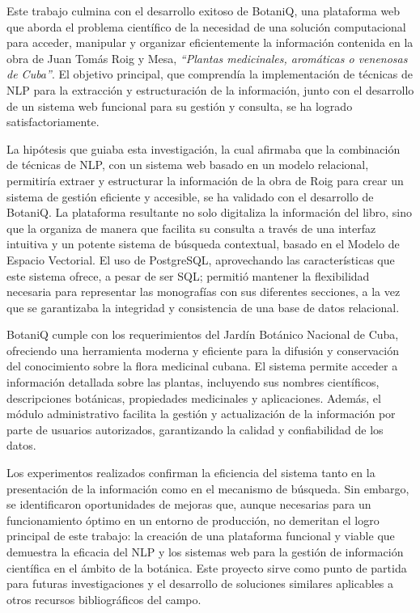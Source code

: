 \begin{conclusions}
    Este trabajo culmina con el desarrollo exitoso de BotaniQ, una plataforma web 
    que aborda el problema científico de la necesidad de una solución computacional 
    para acceder, manipular y organizar eficientemente la información contenida 
    en la obra de Juan Tomás Roig y Mesa, 
    \textit{``Plantas medicinales, aromáticas o venenosas de Cuba''}. 
    El objetivo principal, que comprendía la implementación de técnicas de NLP para 
    la extracción y estructuración de la información, junto con el desarrollo de 
    un sistema web funcional para su gestión y consulta, se ha logrado satisfactoriamente.

    La hipótesis que guiaba esta investigación, la cual afirmaba que la combinación 
    de técnicas de NLP, con un sistema web basado en un modelo relacional, permitiría 
    extraer y estructurar la información de la obra de Roig para crear un sistema 
    de gestión eficiente y accesible, se ha validado con el desarrollo de BotaniQ. 
    La plataforma resultante no solo digitaliza la información del libro, sino que 
    la organiza de manera que facilita su consulta a través de una interfaz intuitiva 
    y un potente sistema de búsqueda contextual, basado en el Modelo de Espacio Vectorial. 
    El uso de PostgreSQL, aprovechando las características que este sistema ofrece, 
    a pesar de ser SQL; permitió mantener la flexibilidad necesaria para representar las monografías 
    con sus diferentes secciones, a la vez que se garantizaba la integridad y 
    consistencia de una base de datos relacional.

    BotaniQ cumple con los requerimientos del Jardín Botánico Nacional de Cuba, 
    ofreciendo una herramienta moderna y eficiente para la difusión y conservación del 
    conocimiento sobre la flora medicinal cubana. El sistema permite acceder a información 
    detallada sobre las plantas, incluyendo sus nombres científicos, descripciones botánicas, 
    propiedades medicinales y aplicaciones. Además, el módulo administrativo facilita 
    la gestión y actualización de la información por parte de usuarios autorizados, 
    garantizando la calidad y confiabilidad de los datos.

    Los experimentos realizados confirman la eficiencia del sistema tanto en la 
    presentación de la información como en el mecanismo de búsqueda. Sin embargo, 
    se identificaron oportunidades de mejoras que, aunque necesarias para un 
    funcionamiento óptimo en un entorno de producción, no demeritan el logro principal 
    de este trabajo: la creación de una plataforma funcional y viable que demuestra 
    la eficacia del NLP y los sistemas web para la gestión de información científica 
    en el ámbito de la botánica. Este proyecto sirve como punto de partida para 
    futuras investigaciones y el desarrollo de soluciones similares aplicables a 
    otros recursos bibliográficos del campo.
\end{conclusions}
